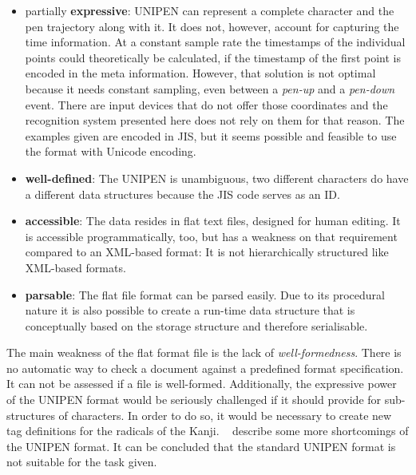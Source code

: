 \begin{itemize}
  \item partially \textbf{expressive}: UNIPEN can represent a complete character
        and the pen trajectory along with it. It does not, however, account for
        capturing the time information. At a constant sample rate the timestamps
        of the individual points could theoretically be calculated, 
        if the timestamp of the first point is encoded in the meta information. 
        However, that solution is not optimal because it needs constant
        sampling, even between a \emph{pen-up} and a \emph{pen-down} event.
        There are input devices that do not offer those coordinates and the 
        recognition system presented here does not rely on them for that reason.
        The examples given are encoded in JIS, but it seems possible and feasible
        to use the format with Unicode encoding.

  \item \textbf{well-defined}: The UNIPEN is unambiguous, two different 
        characters do have a different data structures because the JIS code 
        serves as an ID.

  \item \textbf{accessible}: The data resides in flat text files, designed for 
        human editing. It is accessible programmatically, too, but has a weakness
        on that requirement compared to an XML-based format: It is not 
        hierarchically structured like XML-based formats.

  \item \textbf{parsable}: The flat file format can be parsed easily. Due to its
        procedural nature it is also possible to create a run-time data structure
        that is conceptually based on the storage structure and therefore
        serialisable.
\end{itemize}
The main weakness of the flat format file is the lack of \emph{well-formedness}.
There is no automatic way to check a document against a predefined format 
specification. It can not be assessed if a file is well-formed.
Additionally, the expressive power of the UNIPEN format would be seriously 
challenged if it should provide for sub-structures of characters.
In order to do so, it would be necessary to create new tag definitions for the 
radicals of the Kanji. ~\citeyear{Agrawal2005} 
describe some more shortcomings of the UNIPEN format. It can be concluded that 
the standard UNIPEN format is not suitable for the task given. 


